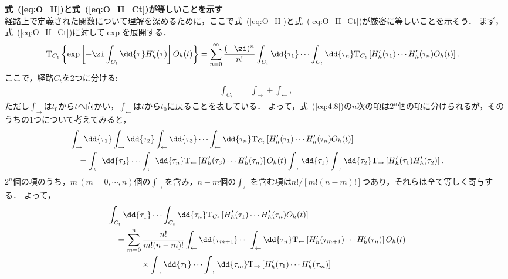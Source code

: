 \documentclass[a4paper,10pt]{jsarticle}
\begin{document}
\textbf{式~(\ref{eq:O_H})と式~(\ref{eq:O_H_Ct})が等しいことを示す}\\
経路上で定義された関数について理解を深めるために，ここで式~(\ref{eq:O_H})と式~(\ref{eq:O_H_Ct})が厳密に等しいことを示そう．
まず，式~(\ref{eq:O_H_Ct})に対して$\exp$を展開する．
\begin{align}
\mathrm{T}_{C_t} \left\{ \exp \left[ - \zi \int_{C_t} \dd{\tau} H'_h (\tau) \right] O_h (t) \right\}
	& = \sum_{n = 0}^{\infty} \frac{(-\zi)^n}{n!} \int_{C_t} \dd{\tau_1} \cdots \int_{C_t} \dd{\tau_n}
		\mathrm{T}_{C_t} \left[
			H'_h (\tau_1) \cdots H'_h (\tau_n) O_h (t)
		\right]
\label{eq:4.8}
.\end{align}
ここで，経路$C_t$を2つに分ける:
\begin{align}
\int_{C_t}
	& = \int_{\rightarrow} + \int_{\leftarrow}
,\end{align}
ただし$\int_{\rightarrow}$は$t_0$から$t$へ向かい，$\int_{\leftarrow}$は$t$から$t_0$に戻ることを表している．
よって，式~(\ref{eq:4.8})の$n$次の項は$2^n$個の項に分けられるが，そのうちの1つについて考えてみると，
\begin{align}
& \int_{\rightarrow} \dd{\tau_1} \int_{\rightarrow} \dd{\tau_2} \int_{\leftarrow} \dd{\tau_3} \cdots \int_{\leftarrow} \dd{\tau_n}
	\mathrm{T}_{C_t} \left[ H'_h (\tau_1) \cdots H'_h (\tau_n) O_h (t) \right]
\notag \\ & \hspace{1em}
	= \int_{\leftarrow} \dd{\tau_3} \cdots \int_{\leftarrow} \dd{\tau_n} \mathrm{T}_{\leftarrow} \left[ H'_h (\tau_3) \cdots H'_h (\tau_n) \right]
	O_h (t)
	\int_{\rightarrow} \dd{\tau_1} \int_{\rightarrow} \dd{\tau_2} \mathrm{T}_{\rightarrow} \left[ H'_h (\tau_1) H'_h (\tau_2) \right]
.\end{align}
$2^n$個の項のうち，$m \,(m = 0, \cdots, n)$個の$\int_{\rightarrow}$を含み，$n-m$個の$\int_{\leftarrow}$を含む項は$n! / [m! (n-m)!]$つあり，それらは全て等しく寄与する．
よって，
\begin{align}
& \int_{C_t} \dd{\tau_1} \cdots \int_{C_t} \dd{\tau_n} \mathrm{T}_{C_t} \left[ H'_h (\tau_1) \cdots H'_h (\tau_n) O_h (t) \right]
\notag \\ & \hspace{1em}
	= \sum_{m = 0}^{n} \frac{n!}{m! (n-m)!}
	\int_{\leftarrow} \dd{\tau_{m+1}} \cdots \int_{\leftarrow} \dd{\tau_n} \mathrm{T}_{\leftarrow} \left[ H'_h (\tau_{m+1}) \cdots H'_h (\tau_n) \right]
	O_h (t)
\notag \\ & \hspace{4em} \times
	\int_{\rightarrow} \dd{\tau_1} \cdots \int_{\rightarrow} \dd{\tau_m} \mathrm{T}_{\rightarrow} \left[ H'_h (\tau_1) \cdots H'_h (\tau_m) \right]	
\label{eq:4.11}
\end{align}
\end{document}
